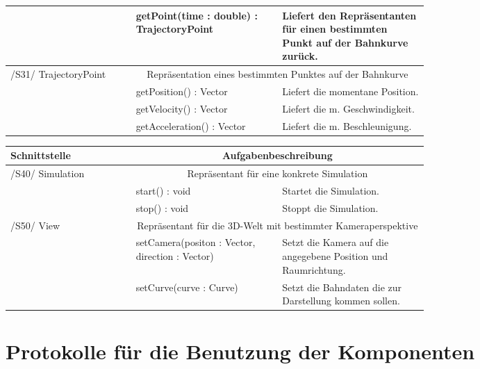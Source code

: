 \begin{tabular}[ht]{|l|p{0.35\linewidth}|p{0.35\linewidth}|}
 & getPoint(time : double) : TrajectoryPoint & Liefert den Repräsentanten für einen bestimmten Punkt auf der Bahnkurve zurück.\\ 
 \hline
 	/S31/ TrajectoryPoint & \multicolumn{2}{|c|}{Repräsentation eines bestimmten Punktes auf der Bahnkurve}\\
 \hline
 & getPosition() : Vector & Liefert die momentane Position.\\ 
 & getVelocity() : Vector & Liefert die m. Geschwindigkeit.\\ 
 & getAcceleration() : Vector & Liefert die m. Beschleunigung. \\ 
 \hline
 \end{tabular}

\begin{tabular}[ht]{|l|p{0.35\linewidth}|p{0.35\linewidth}|}
 \hline
 Schnittstelle & \multicolumn{2}{|c|}{Aufgabenbeschreibung}\\
 \hline
 \hline
    /S40/ Simulation & \multicolumn{2}{|c|}{Repräsentant für eine konkrete Simulation}\\
 \hline
 & start() : void & Startet die Simulation.\\ 
 & stop() : void & Stoppt die Simulation. \\ 
\hline
	/S50/ View & \multicolumn{2}{|c|}{Repräsentant für die 3D-Welt mit bestimmter Kameraperspektive}\\
\hline
 & setCamera(positon : Vector, direction : Vector) & Setzt die Kamera auf die angegebene Position und Raumrichtung. \\ 
 \hline

 & setCurve(curve : Curve) & Setzt die Bahndaten die zur Darstellung kommen sollen. \\ 
 \hline

 \end{tabular}





\section{Protokolle für die Benutzung der Komponenten}


